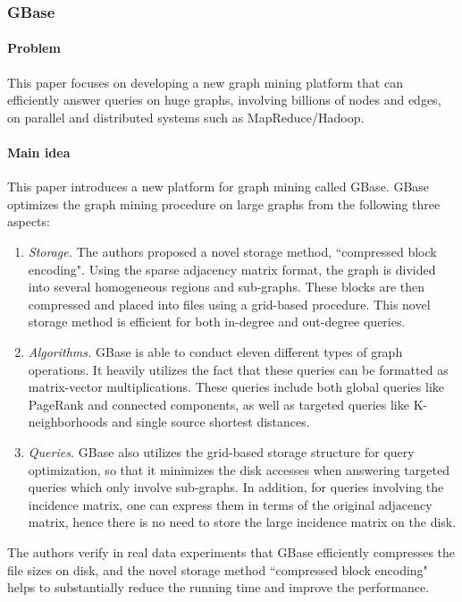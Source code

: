 \subsubsection{GBase \cite{kang2012gbase} }

\paragraph{Problem} This paper focuses on developing a new graph mining platform that can efficiently answer queries on huge graphs, involving billions of nodes and edges, on parallel and distributed systems such as MapReduce/Hadoop. 

\paragraph{Main idea} This paper introduces a new platform for graph mining called GBase. GBase optimizes the graph mining procedure on large graphs from the following three aspects:
\begin{enumerate}
\item {\it Storage.} The authors proposed a novel storage method, ``compressed block encoding". Using the sparse adjacency matrix format, the graph is divided into several homogeneous regions and sub-graphs. These blocks are then compressed and placed into files using a grid-based procedure. This novel storage method is efficient for both in-degree and out-degree queries.

\item {\it Algorithms.} GBase is able to conduct eleven different types of graph operations. It heavily utilizes the fact that these queries can be formatted as matrix-vector multiplications. These queries include both global queries like PageRank and connected components, as well as targeted queries like K-neighborhoods and single source shortest distances. 

\item {\it Queries.} GBase also utilizes the grid-based storage structure for query optimization, so that it minimizes the disk accesses when answering targeted queries which only involve sub-graphs.  In addition, for queries involving the incidence matrix, one can express them in terms of the original adjacency matrix, hence there is no need to store the large incidence matrix on the disk.
\end{enumerate}

The authors verify in real data experiments that GBase efficiently compresses the file sizes on disk, and the novel storage method ``compressed block encoding" helps to substantially reduce the running time and improve the performance.  


